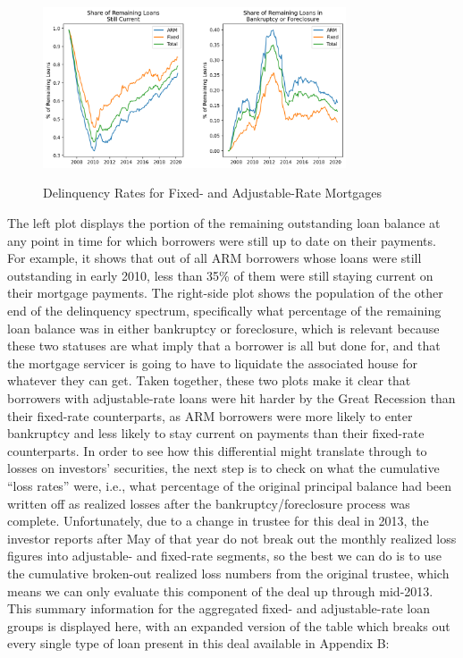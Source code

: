\documentclass[12pt]{article}
\begin{document}
\begin{figure}[h]
	\centering
	\caption{Delinquency Rates for Fixed- and Adjustable-Rate Mortgages}
	\includegraphics[width=0.8\textwidth]{../figures/timeseries_delinq_status_fixed_vs_arm}
	\label{fig:timeseries_delinq_stats_fixed_vs_arm}
\end{figure}

The left plot displays the portion of the remaining outstanding loan balance at any point in time for which borrowers were still up to date on their payments. For example, it shows that out of all ARM borrowers whose loans were still outstanding in early 2010, less than 35\% of them were still staying current on their mortgage payments. The right-side plot shows the population of the other end of the delinquency spectrum, specifically what percentage of the remaining loan balance was in either bankruptcy or foreclosure, which is relevant because these two statuses are what imply that a borrower is all but done for, and that the mortgage servicer is going to have to liquidate the associated house for whatever they can get. Taken together, these two plots make it clear that borrowers with adjustable-rate loans were hit harder by the Great Recession than their fixed-rate counterparts, as ARM borrowers were more likely to enter bankruptcy and less likely to stay current on payments than their fixed-rate counterparts. In order to see how this differential might translate through to losses on investors’ securities, the next step is to check on what the cumulative “loss rates” were, i.e., what percentage of the original principal balance had been written off as realized losses after the bankruptcy/foreclosure process was complete. Unfortunately, due to a change in trustee for this deal in 2013, the investor reports after May of that year do not break out the monthly realized loss figures into adjustable- and fixed-rate segments, so the best we can do is to use the cumulative broken-out realized loss numbers from the original trustee, which means we can only evaluate this component of the deal up through mid-2013. This summary information for the aggregated fixed- and adjustable-rate loan groups is displayed here, with an expanded version of the table which breaks out every single type of loan present in this deal available in Appendix B:
\end{document}
